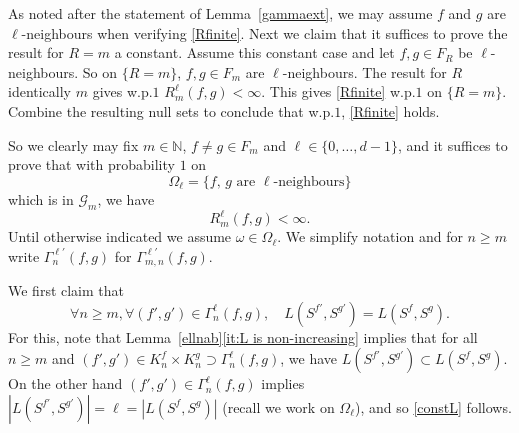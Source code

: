 \documentclass[12pt]{article}
\makeatletter
\renewenvironment{proof}[1][\proofname]{%
\par\pushQED{\qed}\normalfont%
\topsep6\p@\@plus6\p@\relax
\trivlist\item[\hskip\labelsep\bfseries#1\@addpunct{.}]%
\ignorespaces
}{%
\popQED\endtrivlist\@endpefalse
}
\numberwithin{theorem}{section}
\theoremstyle{def}
\numberwithin{equation}{section}
\newcommand{\N}{\mathbb{N}}
\newcommand{\cG}{\mathcal G}
\makeatother
\begin{document}
\begin{proof}[Proof of Lemma~\ref{gammaext}]
As noted after the statement of Lemma~\ref{gammaext}, we may assume $f$ and $g$ are $\ell$-neighbours when verifying \eqref{Rfinite}. 
Next we claim that it suffices to prove the result for $R=m$ a constant.
Assume this constant case and let $f,g\in F_R$ be $\ell$-neighbours.  
So on $\{R=m\}$, $f,g\in F_m$ are $\ell$-neighbours. 
The result for $R$ identically $m$ gives w.p.$1$ $R_m^\ell(f,g)<\infty$.  
This gives \eqref{Rfinite} w.p.$1$ on $\{R=m\}$.  
Combine the resulting null sets to conclude that w.p.$1$, \eqref{Rfinite} holds.  

So we clearly may fix $m\in\N$, $f\neq g\in F_m$ and $\ell\in\{0,\dots,d-1\}$, and it suffices to prove that with probability $1$ on 
\[\Omega_\ell=\{\text{$f$, $g$ are $\ell$-neighbours}\}\]
which is in $\cG_m$, we have
\begin{equation}\label{Rmfinite}
R^\ell_m(f,g)<\infty.
\end{equation}
Until otherwise indicated we assume $\omega\in\Omega_\ell$. 
We simplify notation and for $n\ge m$ write $\Gamma_n^{\ell'}(f,g)$ for $\Gamma_{m,n}^{\ell'}(f,g)$. 

We first claim that 
\begin{equation}\label{constL}
\forall n\ge m, \forall (f',g')\in \Gamma_n^\ell(f,g), \quad L(S^{f'},S^{g'})=L(S^f,S^g).
\end{equation}
For this, note that Lemma~\ref{ellnab}\ref{it:L is non-increasing} implies that for all $n\ge m$ and $(f',g')\in K^f_n\times K_n^g\supset \Gamma_n^{\ell}(f,g)$, we have  $L(S^{f'},S^{g'})\subset L(S^f,S^g)$. 
On the other hand  $(f',g')\in\Gamma^\ell_n(f,g)$ implies $|L(S^{f'},S^{g'})|=\ell=|L(S^f,S^g)|$ (recall we work on $\Omega_\ell$), and so \eqref{constL} follows. 


\end{proof}
\end{document}

